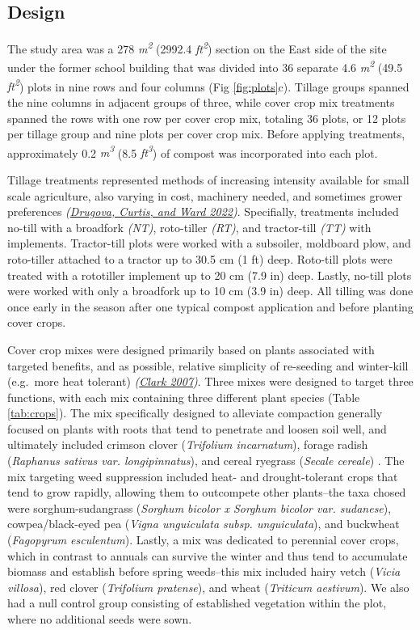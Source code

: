 \documentclass[
]{article}
\begin{document}
\hypertarget{design}{%
\subsection{Design}\label{design}}

The study area was a 278 \emph{m\textsuperscript{2}} (2992.4 \emph{ft\textsuperscript{2}}) section on the East side of the site under the former school building that was divided into 36 separate 4.6 \emph{m\textsuperscript{2}} (49.5 \emph{ft\textsuperscript{2}}) plots in nine rows and four columns (Fig \ref{fig:plots}c).
Tillage groups spanned the nine columns in adjacent groups of three, while cover crop mix treatments spanned the rows with one row per cover crop mix, totaling 36 plots, or 12 plots per tillage group and nine plots per cover crop mix.
Before applying treatments, approximately 0.2 \emph{m\textsuperscript{3}} (8.5 \emph{ft\textsuperscript{3}}) of compost was incorporated into each plot.

Tillage treatments represented methods of increasing intensity available for small scale agriculture, also varying in cost, machinery needed, and sometimes grower preferences \emph{(\protect\hyperlink{ref-drugova22}{Drugova, Curtis, and Ward 2022})}.
Specifially, treatments included no-till with a broadfork \emph{(NT)}, roto-tiller \emph{(RT)}, and tractor-till \emph{(TT)} with implements.
Tractor-till plots were worked with a subsoiler, moldboard plow, and roto-tiller attached to a tractor up to 30.5 cm (1 ft) deep.
Roto-till plots were treated with a rototiller implement up to 20 cm (7.9 in) deep.
Lastly, no-till plots were worked with only a broadfork up to 10 cm (3.9 in) deep.
All tilling was done once early in the season after one typical compost application and before planting cover crops.

Cover crop mixes were designed primarily based on plants associated with targeted benefits, and as possible, relative simplicity of re-seeding and winter-kill (e.g.~more heat tolerant) \emph{(\protect\hyperlink{ref-clark07}{Clark 2007})}.
Three mixes were designed to target three functions, with each mix containing three different plant species (Table \ref{tab:crops}).
The mix specifically designed to alleviate compaction generally focused on plants with roots that tend to penetrate and loosen soil well, and ultimately included
crimson clover (\emph{Trifolium incarnatum}),
forage radish (\emph{Raphanus sativus var. longipinnatus}), and
cereal ryegrass (\emph{Secale cereale})
.
The mix targeting weed suppression included heat- and drought-tolerant crops that tend to grow rapidly, allowing them to outcompete other plants--the taxa chosed were
sorghum-sudangrass (\emph{Sorghum bicolor x Sorghum bicolor var. sudanese}),
cowpea/black-eyed pea (\emph{Vigna unguiculata subsp. unguiculata}), and
buckwheat (\emph{Fagopyrum esculentum}).
Lastly, a mix was dedicated to perennial cover crops, which in contrast to annuals can survive the winter and thus tend to accumulate biomass and establish before spring weeds--this mix included
hairy vetch (\emph{Vicia villosa}),
red clover (\emph{Trifolium pratense}), and
wheat (\emph{Triticum aestivum}).
We also had a null control group consisting of established vegetation within the plot, where no additional seeds were sown.
\end{document}
